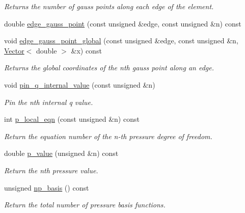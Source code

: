 \begin{DoxyCompactItemize}
\begin{DoxyCompactList}\small\item\em Returns the number of gauss points along each edge of the element. \end{DoxyCompactList}\item 
double \hyperlink{classoomph_1_1TPoroelasticityElement_a1c6d52613fdb0e2d56c49ef17f4774bc}{edge\+\_\+gauss\+\_\+point} (const unsigned \&edge, const unsigned \&n) const
\item 
void \hyperlink{classoomph_1_1TPoroelasticityElement_ae16942ca84bf7bc23eed93cdeb08efce}{edge\+\_\+gauss\+\_\+point\+\_\+global} (const unsigned \&edge, const unsigned \&n, \hyperlink{classoomph_1_1Vector}{Vector}$<$ double $>$ \&x) const
\begin{DoxyCompactList}\small\item\em Returns the global coordinates of the nth gauss point along an edge. \end{DoxyCompactList}\item 
void \hyperlink{classoomph_1_1TPoroelasticityElement_a47d4f048c1120647968b844927db7877}{pin\+\_\+q\+\_\+internal\+\_\+value} (const unsigned \&n)
\begin{DoxyCompactList}\small\item\em Pin the nth internal q value. \end{DoxyCompactList}\item 
int \hyperlink{classoomph_1_1TPoroelasticityElement_a4c1290c4e7fd01b244ec46728e5c47f1}{p\+\_\+local\+\_\+eqn} (const unsigned \&n) const
\begin{DoxyCompactList}\small\item\em Return the equation number of the n-\/th pressure degree of freedom. \end{DoxyCompactList}\item 
double \hyperlink{classoomph_1_1TPoroelasticityElement_a82a753eb277514e69bd44025a11c18d6}{p\+\_\+value} (unsigned \&n) const
\begin{DoxyCompactList}\small\item\em Return the nth pressure value. \end{DoxyCompactList}\item 
unsigned \hyperlink{classoomph_1_1TPoroelasticityElement_a5857ac5848d232bfc8b9ae84dde851fe}{np\+\_\+basis} () const
\begin{DoxyCompactList}\small\item\em Return the total number of pressure basis functions. \end{DoxyCompactList}\item 

\end{DoxyCompactItemize}
